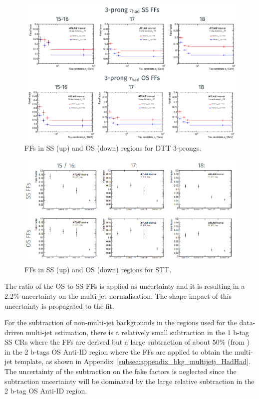 \begin{figure}[h]
  \centering

  \includegraphics[width=.85\textwidth]{figures/systs/hadhad_multijet/OSSS_DTT3P}
  \caption{FFs in SS (up) and OS (down) regions for DTT 3-prongs.}

  \label{fig:systs_HadHad_multijet_OSSSDTT3P}
\end{figure}

\begin{figure}[h]
  \centering

  \includegraphics[width=.85\textwidth]{figures/systs/hadhad_multijet/OSSS_STT}
  \caption{FFs in SS (up) and OS (down) regions for STT.}

  \label{fig:systs_HadHad_multijet_OSSSSTT}
\end{figure}

The ratio of the OS to SS FFs is applied as uncertainty and it is resulting in a
2.2\% uncertainty on the multi-jet normalisation. The shape impact of this
uncertainty is propagated to the fit.

For the subtraction of non-multi-jet backgrounds in the regions used for the
data-driven multi-jet estimation, there is a relatively small subtraction in the
1 b-tag SS CRs where the FFs are derived but a large subtraction of about 50\%
(from \ttbar) in the 2 b-tags OS Anti-ID region where the FFs are applied to
obtain the multi-jet template, as shown in
Appendix~\ref{subsec:appendix_bkg_multijetj_HadHad}. The uncertainty of the
subtraction on the fake factors is neglected since the subtraction uncertainty
will be dominated by the large relative subtraction in the 2 b-tag OS Anti-ID
region.

